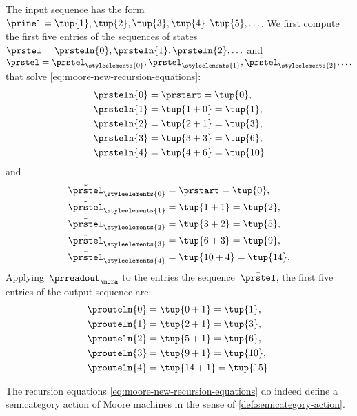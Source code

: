\begin{example}
    The input sequence has the form~$\prinel = \tup{1}, \tup{2}, \tup{3}, \tup{4}, \tup{5}, \ldots$.
    We first compute the first five entries of the sequences of states~$\prstel = \prsteln{0}, \prsteln{1}, \prsteln{2}, \ldots$ and~$\tilde{\prstel} = \tilde{\prstel}_\styleelements{0}, \tilde{\prstel}_\styleelements{1}, \tilde{\prstel}_\styleelements{2}, \ldots$ that solve \cref{eq:moore-new-recursion-equations}:
    \begin{align*}
        \prsteln{0} & = \prstart = \tup{0}, \\
        \prsteln{1} & = \tup{1 + 0} = \tup{1}, \\
        \prsteln{2} & = \tup{2 + 1} = \tup{3}, \\
        \prsteln{3} & = \tup{3 + 3} = \tup{6}, \\
        \prsteln{4} & = \tup{4 + 6} = \tup{10}
    \end{align*}
    and
    \begin{align*}
        \tilde{\prstel}_\styleelements{0} & = \prstart = \tup{0}, \\
        \tilde{\prstel}_\styleelements{1} & = \tup{1 + 1} = \tup{2}, \\
        \tilde{\prstel}_\styleelements{2} & = \tup{3 + 2} = \tup{5}, \\
        \tilde{\prstel}_\styleelements{3} & = \tup{6 + 3} = \tup{9}, \\
        \tilde{\prstel}_\styleelements{4} & = \tup{10 + 4} = \tup{14}.
    \end{align*}
    Applying~$\prreadout_\mora$ to the entries the sequence~$\tilde \prstel$, the first five entries of the output sequence are:
    \begin{align*}
        \prouteln{0} & = \tup{0 + 1} = \tup{1}, \\
        \prouteln{1} & = \tup{2 + 1} = \tup{3}, \\
        \prouteln{2} & = \tup{5 + 1} = \tup{6}, \\
        \prouteln{3} & = \tup{9 + 1} = \tup{10}, \\
        \prouteln{4} & = \tup{14 + 1} = \tup{15}.
    \end{align*}
\end{example}


\begin{lemma}
    The recursion equations \cref{eq:moore-new-recursion-equations} do indeed define a semicategory action of Moore machines in the sense of \cref{def:semicategory-action}.
\end{lemma}

